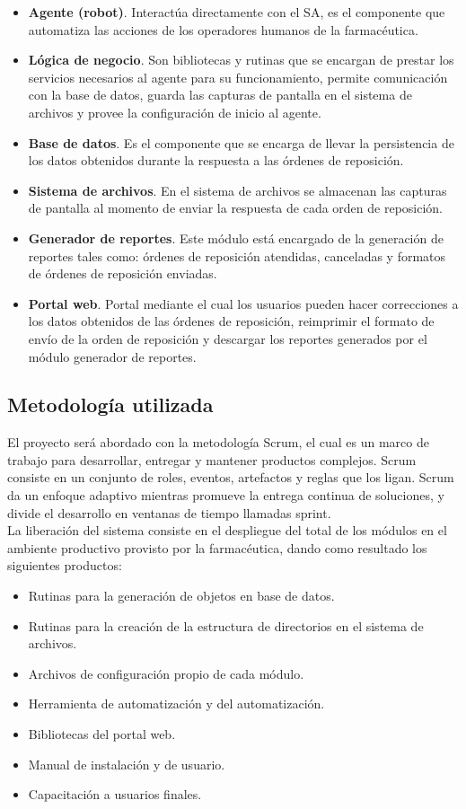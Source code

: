 \begin{itemize}
\item \textbf{Agente (robot)}. Interactúa directamente con el SA, es el componente que automatiza las acciones de los operadores humanos de la farmacéutica.
\item \textbf{Lógica de negocio}. Son bibliotecas y rutinas que se encargan de prestar los servicios necesarios al agente para su funcionamiento, permite comunicación con la base de datos, guarda las capturas de pantalla en el sistema de archivos y provee la configuración de inicio al agente.
\item \textbf{Base de datos}. Es el componente que se encarga de llevar la persistencia de los datos obtenidos durante la respuesta a las órdenes de reposición.
\item \textbf{Sistema de archivos}. En el sistema de archivos se almacenan las capturas de pantalla al momento de enviar la respuesta de cada orden de reposición.
\item \textbf{Generador de reportes}. Este módulo está encargado de la generación de reportes tales como: órdenes de reposición atendidas, canceladas y formatos de órdenes de reposición enviadas.
\item \textbf{Portal web}. Portal mediante el cual los usuarios pueden hacer correcciones a los datos obtenidos de las órdenes de reposición, reimprimir el formato de envío de la orden de reposición  y descargar los reportes generados por el módulo generador de reportes.
\end{itemize}

\subsection{Metodología utilizada}
El proyecto será abordado con la metodología Scrum, el cual es un marco de trabajo para desarrollar, entregar y mantener productos complejos. Scrum consiste en un conjunto de roles, eventos, artefactos y reglas que los ligan. Scrum da un enfoque adaptivo mientras promueve la entrega continua de soluciones, y divide el desarrollo en ventanas de tiempo llamadas sprint\cite{scrum}.\\
La liberación del sistema consiste en el despliegue del total de los módulos en el ambiente productivo provisto por la farmacéutica, dando como resultado los siguientes productos:
\begin{itemize}
\item Rutinas para la generación de objetos en base de datos.
\item Rutinas para la creación de la estructura de directorios en el sistema de archivos.
\item Archivos de configuración propio de cada módulo.
\item Herramienta de automatización y del automatización.
\item Bibliotecas del portal web.
\item Manual de instalación y de usuario.
\item Capacitación a usuarios finales.
\end{itemize}
 
